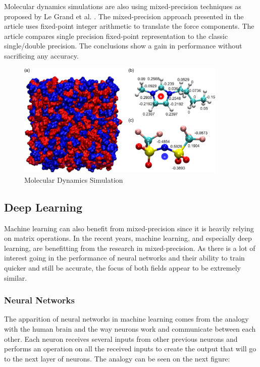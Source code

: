 Molecular dynamics simulations are also using mixed-precision techniques as proposed by Le Grand et al. \cite{LeGrand2013}. The mixed-precision approach presented in the article uses fixed-point integer arithmetic to translate the force components. The article compares single precision fixed-point representation to the classic single/double precision. The conclusions show a gain in performance without sacrificing any accuracy.

\begin{figure}[htbp]
	\centering
		\includegraphics[width=10cm]{Figures/MolecularSim.png}
	\caption[Molecular Dynamics Simulation]{Molecular Dynamics Simulation \cite{Feng2019}}
	\label{fig:MolecularSim}
\end{figure}


\subsection{Deep Learning}

Machine learning can also benefit from mixed-precision since it is heavily relying on matrix operations. In the recent years, machine learning, and especially deep learning, are benefitting from the research in mixed-precision. As there is a lot of interest going in the performance of neural networks and their ability to train quicker and still be accurate, the focus of both fields appear to be extremely similar.


\subsubsection{Neural Networks}

The apparition of neural networks in machine learning comes from the analogy with the human brain and the way neurons work and communicate between each other. Each neuron receives several inputs from other previous neurons and performs an operation on all the received inputs to create the output that will go to the next layer of neurons. The analogy can be seen on the next figure:

